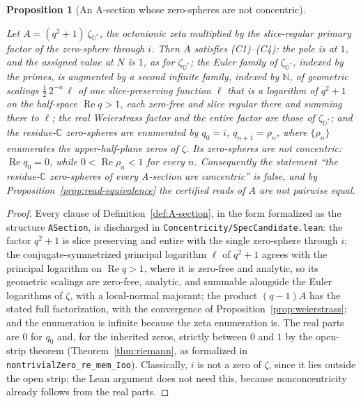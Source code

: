 \documentclass[11pt]{article}
\newcommand{\OO}{\mathbb{O}}
\newcommand{\CC}{\mathbb{C}}
\newcommand{\Ostar}{\OO^{*}}
\newcommand{\zetaO}{\zeta_{\Ostar}}
\DeclareMathOperator{\re}{Re}
\providecommand{\lean}[1]{}
\providecommand{\leanok}{}
\providecommand{\uses}[1]{}
\theoremstyle{plain}
\newtheorem{proposition}[theorem]{Proposition}
\theoremstyle{definition}
\theoremstyle{remark}
\begin{document}
\begin{proposition}[An A-section whose zero-spheres are not concentric]\label{prop:countermodel}
\lean{SpecCandidate.candidateSection, SpecCandidate.candidateSection_not_concentric,
SpecCandidate.current_ASection_concentricity_type_false,
SpecCandidate.candidateSection_not_pairwiseTransportLevel}
\leanok
\uses{def:A-section, cor:zeta-section, thm:zero-spheres, prop:weierstrass, prop:read-equivalence}
Let $A=(q^{2}+1)\,\zetaO$, the octonionic zeta multiplied by the slice-regular primary factor of
the zero-sphere through $i$. Then $A$ satisfies \textup{(C1)--(C4)}: the pole is at $1$, and the
assigned value at $N$ is $1$, as for $\zetaO$; the Euler family of $\zetaO$, indexed by the primes,
is augmented by a second infinite family, indexed by $\mathbb{N}$, of geometric scalings
$\tfrac12\,2^{-n}\,\ell$ of one slice-preserving function $\ell$ that is a logarithm of $q^{2}+1$
on the half-space $\re q>1$, each zero-free and slice regular there and summing there to $\ell$; the real Weierstrass factor and the entire factor are those of
$\zetaO$; and the residue-$\CC$ zero-spheres are enumerated by $q_0=i$, $q_{n+1}=\rho_n$, where
$\{\rho_n\}$ enumerates the upper-half-plane zeros of $\zeta$. Its zero-spheres are not
concentric: $\re q_0=0$, while $0<\re\rho_n<1$ for every $n$. Consequently the statement
``the residue-$\CC$ zero-spheres of every A-section are concentric'' is false, and by
Proposition~\ref{prop:read-equivalence} the certified reads of $A$ are not pairwise equal.
\end{proposition}
\begin{proof}
Every clause of Definition~\ref{def:A-section}, in the form formalized as the structure
\texttt{ASection}, is discharged in \texttt{Concentricity/SpecCandidate.lean}: the factor
$q^{2}+1$ is slice preserving and entire with the single zero-sphere through $i$; the
conjugate-symmetrized principal logarithm $\ell$ of $q^{2}+1$ agrees with the principal logarithm
on $\re q>1$, where it is zero-free and analytic, so its geometric scalings are zero-free, analytic,
and summable alongside the Euler logarithms of $\zeta$, with a local-normal majorant; the product
$(q-1)A$ has the stated full factorization,
with the convergence of Proposition~\ref{prop:weierstrass}; and the enumeration is infinite
because the zeta enumeration is. The real parts are $0$ for $q_0$ and, for the inherited zeros,
strictly between $0$ and $1$ by the open-strip theorem (Theorem~\ref{thm:riemann}, as formalized
in \texttt{nontrivialZero\_re\_mem\_Ioo}). Classically, $i$ is not a zero of $\zeta$, since it lies
outside the open strip; the Lean argument does not need this, because nonconcentricity already
follows from the real parts.
\end{proof}
\end{document}

